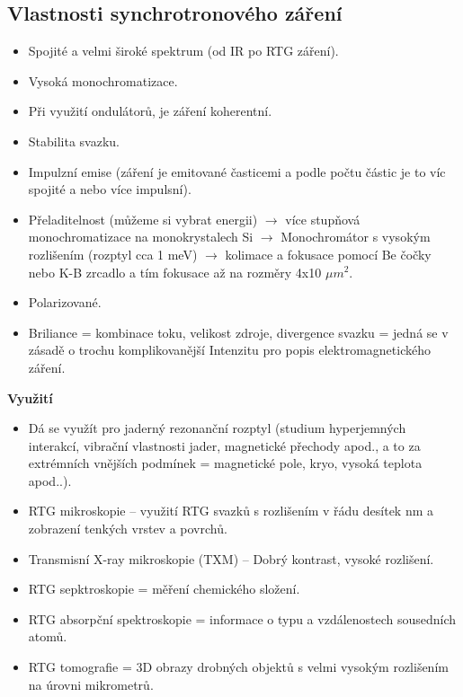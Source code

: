 \subsection{Vlastnosti synchrotronového záření}

\begin{itemize}
    \item Spojité a velmi široké spektrum (od IR po RTG záření).
    \item Vysoká monochromatizace.
    \item Při využití ondulátorů, je záření koherentní.
    \item Stabilita svazku.
    \item Impulzní emise (záření je emitované časticemi a podle počtu částic je to víc spojité a nebo více impulsní).
    \item Přeladitelnost (můžeme si vybrat energii) $\rightarrow$ více stupňová monochromatizace na monokrystalech Si $\rightarrow$ Monochromátor s vysokým rozlišením (rozptyl cca 1 meV) $\rightarrow$ kolimace a fokusace pomocí Be čočky nebo K-B zrcadlo a tím fokusace až na rozměry 4x10 $\mu m^2$.
    \item Polarizované.
    \item Briliance = kombinace toku, velikost zdroje, divergence svazku = jedná se v zásadě o trochu komplikovanější Intenzitu pro popis elektromagnetického záření. 
\end{itemize}

\textbf{Využití}

\begin{itemize}
    \item Dá se využít pro jaderný rezonanční rozptyl (studium hyperjemných interakcí, vibrační vlastnosti jader, magnetické přechody apod., a to za extrémních vnějších podmínek = magnetické pole, kryo, vysoká teplota apod..).
    \item RTG mikroskopie -- využití RTG svazků s rozlišením v řádu desítek nm a zobrazení tenkých vrstev a povrchů.
    \item Transmisní X-ray mikroskopie (TXM) -- Dobrý kontrast, vysoké rozlišení.
    \item RTG sepktroskopie = měření chemického složení.
    \item RTG absorpční spektroskopie = informace o typu a vzdálenostech sousedních atomů.
    \item RTG tomografie = 3D obrazy drobných objektů s velmi vysokým rozlišením na úrovni mikrometrů.
\end{itemize}

